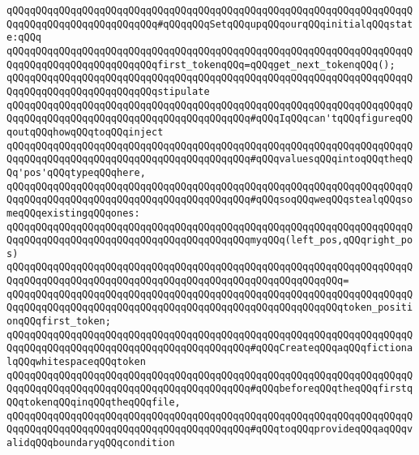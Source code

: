\newline
\verb|qQQqqQQqqQQqqQQqqQQqqQQqqQQqqQQqqQQqqQQqqQQqqQQqqQQqqQQqqQQqqQQqqQQqqQQqqQQqqQQqqQQqqQQqqQQqqQQq#qQQqqQQqSetqQQqupqQQqourqQQqinitialqQQqstate:qQQq|\newline
\verb|qQQqqQQqqQQqqQQqqQQqqQQqqQQqqQQqqQQqqQQqqQQqqQQqqQQqqQQqqQQqqQQqqQQqqQQqqQQqqQQqqQQqqQQqqQQqqQQqfirst_tokenqQQq=qQQqget_next_tokenqQQq();|\newline
\verb|qQQqqQQqqQQqqQQqqQQqqQQqqQQqqQQqqQQqqQQqqQQqqQQqqQQqqQQqqQQqqQQqqQQqqQQqqQQqqQQqqQQqqQQqqQQqqQQqstipulate|\newline
\verb|qQQqqQQqqQQqqQQqqQQqqQQqqQQqqQQqqQQqqQQqqQQqqQQqqQQqqQQqqQQqqQQqqQQqqQQqqQQqqQQqqQQqqQQqqQQqqQQqqQQqqQQqqQQqqQQq#qQQqIqQQqcan'tqQQqfigureqQQqoutqQQqhowqQQqtoqQQqinject|\newline
\verb|qQQqqQQqqQQqqQQqqQQqqQQqqQQqqQQqqQQqqQQqqQQqqQQqqQQqqQQqqQQqqQQqqQQqqQQqqQQqqQQqqQQqqQQqqQQqqQQqqQQqqQQqqQQqqQQq#qQQqvaluesqQQqintoqQQqtheqQQq'pos'qQQqtypeqQQqhere,|\newline
\verb|qQQqqQQqqQQqqQQqqQQqqQQqqQQqqQQqqQQqqQQqqQQqqQQqqQQqqQQqqQQqqQQqqQQqqQQqqQQqqQQqqQQqqQQqqQQqqQQqqQQqqQQqqQQqqQQq#qQQqsoqQQqweqQQqstealqQQqsomeqQQqexistingqQQqones:|\newline
\newline
\verb|qQQqqQQqqQQqqQQqqQQqqQQqqQQqqQQqqQQqqQQqqQQqqQQqqQQqqQQqqQQqqQQqqQQqqQQqqQQqqQQqqQQqqQQqqQQqqQQqqQQqqQQqqQQqqQQqmyqQQq(left_pos,qQQqright_pos)|\newline
\verb|qQQqqQQqqQQqqQQqqQQqqQQqqQQqqQQqqQQqqQQqqQQqqQQqqQQqqQQqqQQqqQQqqQQqqQQqqQQqqQQqqQQqqQQqqQQqqQQqqQQqqQQqqQQqqQQqqQQqqQQqqQQqqQQq=|\newline
\verb|qQQqqQQqqQQqqQQqqQQqqQQqqQQqqQQqqQQqqQQqqQQqqQQqqQQqqQQqqQQqqQQqqQQqqQQqqQQqqQQqqQQqqQQqqQQqqQQqqQQqqQQqqQQqqQQqqQQqqQQqqQQqqQQqtoken_positionqQQqfirst_token;|\newline
\newline
\verb|qQQqqQQqqQQqqQQqqQQqqQQqqQQqqQQqqQQqqQQqqQQqqQQqqQQqqQQqqQQqqQQqqQQqqQQqqQQqqQQqqQQqqQQqqQQqqQQqqQQqqQQqqQQqqQQq#qQQqCreateqQQqaqQQqfictionalqQQqwhitespaceqQQqtoken|\newline
\verb|qQQqqQQqqQQqqQQqqQQqqQQqqQQqqQQqqQQqqQQqqQQqqQQqqQQqqQQqqQQqqQQqqQQqqQQqqQQqqQQqqQQqqQQqqQQqqQQqqQQqqQQqqQQqqQQq#qQQqbeforeqQQqtheqQQqfirstqQQqtokenqQQqinqQQqtheqQQqfile,|\newline
\verb|qQQqqQQqqQQqqQQqqQQqqQQqqQQqqQQqqQQqqQQqqQQqqQQqqQQqqQQqqQQqqQQqqQQqqQQqqQQqqQQqqQQqqQQqqQQqqQQqqQQqqQQqqQQqqQQq#qQQqtoqQQqprovideqQQqaqQQqvalidqQQqboundaryqQQqcondition|\newline
